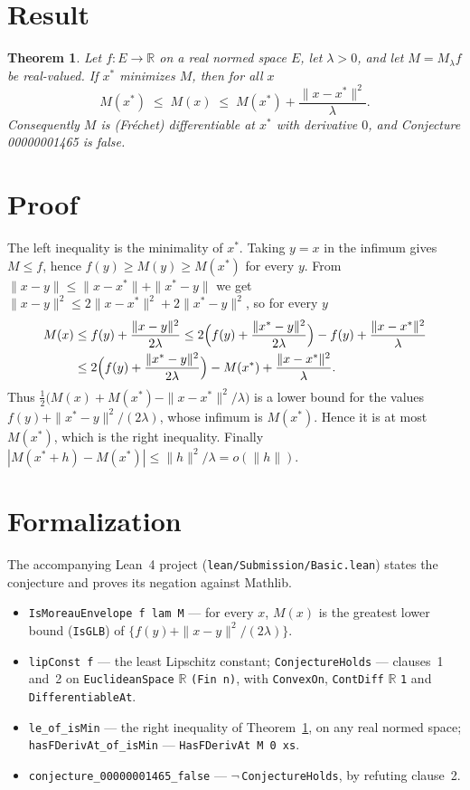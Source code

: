 \documentclass[11pt]{article}
\theoremstyle{plain}
\newtheorem{theorem}{Theorem}
\theoremstyle{definition}
\theoremstyle{remark}
\begin{document}
\section{Result}

\begin{theorem}\label{thm:main}
Let $f\colon E\to\mathbb R$ on a real normed space $E$, let $\lambda>0$, and let
$M=M_\lambda f$ be real-valued. If $x^\ast$ minimizes $M$, then for all $x$
\[
  M(x^\ast)\;\le\;M(x)\;\le\;M(x^\ast)+\frac{\|x-x^\ast\|^2}{\lambda}.
\]
Consequently $M$ is (Fr\'echet) differentiable at $x^\ast$ with derivative $0$,
and Conjecture 00000001465 is false.
\end{theorem}

\section{Proof}

The left inequality is the minimality of $x^\ast$. Taking $y=x$ in the
infimum gives $M\le f$, hence $f(y)\ge M(y)\ge M(x^\ast)$ for every $y$. From
$\|x-y\|\le\|x-x^\ast\|+\|x^\ast-y\|$ we get
$\|x-y\|^2\le2\|x-x^\ast\|^2+2\|x^\ast-y\|^2$, so for every $y$
\begin{align*}
  M(x)&\le f(y)+\frac{\|x-y\|^2}{2\lambda}
  \le 2\Bigl(f(y)+\frac{\|x^\ast-y\|^2}{2\lambda}\Bigr)-f(y)
     +\frac{\|x-x^\ast\|^2}{\lambda}\\
  &\le 2\Bigl(f(y)+\frac{\|x^\ast-y\|^2}{2\lambda}\Bigr)-M(x^\ast)
     +\frac{\|x-x^\ast\|^2}{\lambda}.
\end{align*}
Thus $\frac12\bigl(M(x)+M(x^\ast)-\|x-x^\ast\|^2/\lambda\bigr)$ is a lower bound
for the values $f(y)+\|x^\ast-y\|^2/(2\lambda)$, whose infimum is $M(x^\ast)$.
Hence it is at most $M(x^\ast)$, which is the right inequality. Finally
$|M(x^\ast+h)-M(x^\ast)|\le\|h\|^2/\lambda=o(\|h\|)$.

\section{Formalization}

The accompanying Lean~4 project (\texttt{lean/Submission/Basic.lean}) states
the conjecture and proves its negation against Mathlib.

\begin{itemize}
  \item \texttt{IsMoreauEnvelope f lam M} --- for every $x$, $M(x)$ is the
    greatest lower bound (\texttt{IsGLB}) of
    $\{f(y)+\|x-y\|^2/(2\lambda)\}$.
  \item \texttt{lipConst f} --- the least Lipschitz constant;
    \texttt{ConjectureHolds} --- clauses~1 and~2 on
    \texttt{EuclideanSpace} $\mathbb R$ \texttt{(Fin n)}, with \texttt{ConvexOn},
    \texttt{ContDiff} $\mathbb R$ \texttt{1} and \texttt{DifferentiableAt}.
  \item \texttt{le\_of\_isMin} --- the right inequality of
    Theorem~\ref{thm:main}, on any real normed space;
    \texttt{hasFDerivAt\_of\_isMin} --- \texttt{HasFDerivAt M 0 xs}.
  \item \texttt{conjecture\_00000001465\_false} ---
    $\lnot\,$\texttt{ConjectureHolds}, by refuting clause~2.
\end{itemize}
\end{document}
